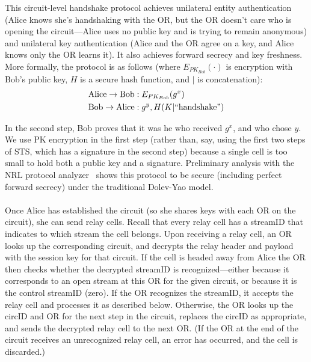 \documentclass[times,10pt,twocolumn]{article}
\begin{document}
This circuit-level handshake protocol achieves unilateral entity
authentication (Alice knows she's handshaking with the OR, but
the OR doesn't care who is opening the circuit---Alice uses no public key
and is trying to remain anonymous) and unilateral key authentication
(Alice and the OR agree on a key, and Alice knows only the OR learns
it). It also achieves forward
secrecy and key freshness. More formally, the protocol is as follows
(where $E_{PK_{Bob}}(\cdot)$ is encryption with Bob's public key,
$H$ is a secure hash function, and $|$ is concatenation):
\begin{equation*}
\begin{aligned}
\mathrm{Alice} \rightarrow \mathrm{Bob}&: E_{PK_{Bob}}(g^x) \\
\mathrm{Bob} \rightarrow \mathrm{Alice}&: g^y, H(K | \mathrm{``handshake"}) \\
\end{aligned}
\end{equation*}

\noindent In the second step, Bob proves that it was he who received $g^x$,
and who chose $y$. We use PK encryption in the first step
(rather than, say, using the first two steps of STS, which has a
signature in the second step) because a single cell is too small to
hold both a public key and a signature. Preliminary analysis with the
NRL protocol analyzer~\cite{meadows96} shows this protocol to be
secure (including perfect forward secrecy) under the
traditional Dolev-Yao model.\\

\\
%
Once Alice has established the circuit (so she shares keys with each
OR on the circuit), she can send relay cells.  Recall that every relay
cell has a streamID that indicates to which
stream the cell belongs.  %
Upon receiving a relay
cell, an OR looks up the corresponding circuit, and decrypts the relay
header and payload with the session key for that circuit.
If the cell is headed away from Alice the OR then checks
whether the decrypted streamID is recognized---either because it
corresponds to an open stream at this OR for the given circuit, or because
it is the control streamID (zero).  If the OR recognizes the
streamID, it accepts the relay cell and processes it as described
below.  Otherwise,
the OR looks up the circID and OR for the
next step in the circuit, replaces the circID as appropriate, and
sends the decrypted relay cell to the next OR.  (If the OR at the end
of the circuit receives an unrecognized relay cell, an error has
occurred, and the cell is discarded.)
\end{document}
